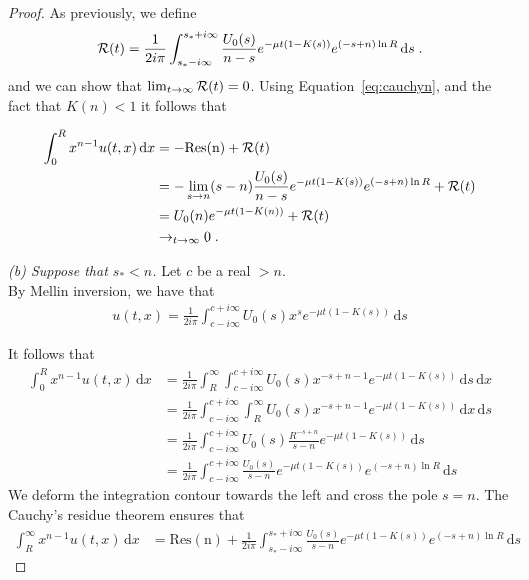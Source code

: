 \documentclass[11pt]{amsart}
\newcommand{\diff}{\,\mathrm{d}}
\begin{document}
\begin{proof}
        
        As previously, we define
        \begin{align*}
            \Rcal(t) = \frac{1}{2i\pi} \int_{s_*-i\infty}^{s_*+i\infty} \frac{U_0(s)}{n-s} e^{-\mu t(1 - K(s))} e^{(-s+n)\ln R} \diff s
            \eqfinp
        \end{align*}
        and we can show that $\lim_{t\to\infty}\mathcal{R}(t) = 0$. Using Equation~\ref{eq:cauchyn}, and the fact that $K(n) < 1$ it follows that 
        
        
        \begin{align*}
            \int_0^R x^{n-1}u(t,x) \diff x &= -\mathrm{Res(n)} + \Rcal(t) \\
            &= -\lim_{s \to n} (s-n)\frac{U_0(s)}{n-s} e^{-\mu t(1 - K(s))} e^{(-s+n)\ln R}  + \Rcal(t)\\
            &= U_0(n)e^{-\mu t(1 - K(n))} + \Rcal(t)\\
            &\to_{t \to \infty} 0
            \eqfinp
        \end{align*}

        \textit{(b) Suppose that $s_* < n$.} Let $c$ be a real $>n$. \\
            By Mellin inversion, we have that
            \begin{align*}
                u(t,x) = \frac{1}{2i\pi}\int_{c-i\infty}^{c+i\infty} U_0(s) x^{s} e^{-\mu t(1 - K(s))} \diff s
            \end{align*}
        
        It follows that
        \begin{align*}
            \int_0^R x^{n-1}u(t,x) \diff x 
            &= \frac{1}{2i\pi} \int_R^{\infty} \int_{c-i\infty}^{c+i\infty} U_0(s) x^{-s+n-1} e^{-\mu t(1 - K(s))} \diff s \diff x \\
            &= \frac{1}{2i\pi} \int_{c-i\infty}^{c+i\infty} \int_R^{\infty} U_0(s) x^{-s+n-1} e^{-\mu t(1 - K(s))} \diff x \diff s \\
            &= \frac{1}{2i\pi} \int_{c-i\infty}^{c+i\infty} U_0(s) \frac{R^{-s+n}}{s-n} e^{-\mu t(1 - K(s))} \diff s \\
            &= \frac{1}{2i\pi} \int_{c-i\infty}^{c+i\infty} \frac{U_0(s)}{s-n} e^{-\mu t(1 - K(s))} e^{(-s+n)\ln R} \diff s
        \end{align*}
        We deform the integration contour towards the left and cross the pole $s = n$. The Cauchy's residue theorem ensures that
        \begin{align}
            \int_R^{\infty} x^{n-1}u(t,x) \diff x &= \mathrm{Res(n)} + \frac{1}{2i\pi} \int_{s_*-i\infty}^{s_*+i\infty} \frac{U_0(s)}{s-n} e^{-\mu t(1 - K(s))} e^{(-s+n)\ln R} \diff s 
            \label{eq:cauchyn}
        \end{align}
        

\end{proof}
\end{document}
